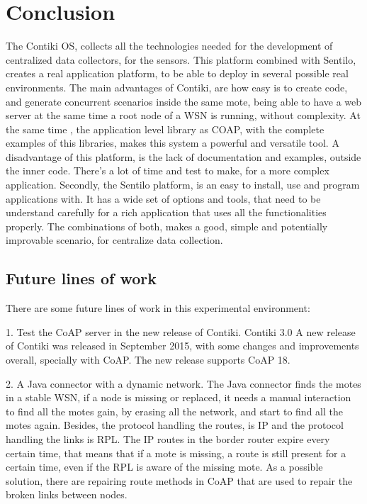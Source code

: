 \section{Conclusion}

The Contiki OS,
	collects all the technologies needed for the development of centralized data collectors,
	for the sensors.
This platform combined with Sentilo,
	creates a real application platform,
	to be able to deploy in several possible real environments.
The main advantages of Contiki,
	are how easy is to create code,
	and generate concurrent scenarios inside the same mote,
	being able to have a web server at the same time a root node of a WSN is running,
	without complexity.
At the same time ,
	the application level library as COAP,
	with the complete examples of this libraries,
	makes this system a powerful and versatile tool.
A disadvantage of this platform,
	is the lack of documentation and examples,
	outside the inner code.
There's a lot of time and test to make,
	for a more complex application.
Secondly,
	the Sentilo platform,
	is an easy to install,
	use and program applications with.
It has a wide set of options and tools,
	that need to be understand carefully for a rich application that uses all the functionalities properly.
The combinations of both,
	makes a good,
	simple and potentially improvable scenario,
	for centralize data collection.

\subsection{Future lines of work}

There are some future lines of work in this experimental environment: 

1. Test the CoAP server in the new release of Contiki.
Contiki 3.0 A new release of Contiki was released in September 2015,
	with some changes and improvements overall,
	specially with CoAP.
The new release supports CoAP 18.

2. A Java connector with a dynamic network.
The Java connector finds the motes in a stable WSN,
	if a node is missing or replaced,
	it needs a manual interaction to find all the motes gain,
	by erasing all the network,
	and start to find all the motes again.
Besides,
	the protocol handling the routes,
	is IP and the protocol handling the links is RPL.
The IP routes in the border router expire every certain time,
	that means that if a mote is missing,
	a route is still present for a certain time,
	even if the RPL is aware of the missing mote.
As a possible solution,
	there are repairing route methods in CoAP that are used to repair the broken links between nodes.




